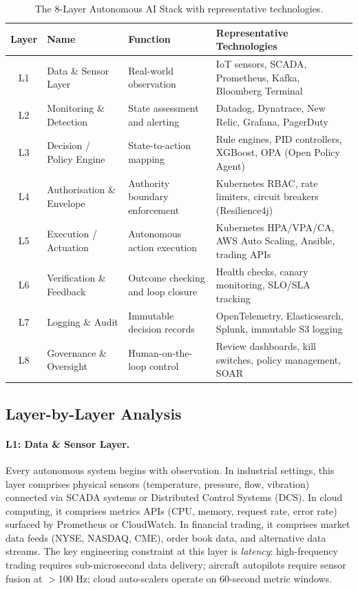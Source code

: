 \documentclass[12pt, a4paper]{article}
\begin{document}
\begin{table}[ht]
\centering
\caption{The 8-Layer Autonomous AI Stack with representative technologies.}
\label{tab:stack}
\begin{tabular}{cllp{7cm}}
\toprule
\textbf{Layer} & \textbf{Name} & \textbf{Function} & \textbf{Representative Technologies} \\
\midrule
L1 & Data \& Sensor Layer         & Real-world observation            & IoT sensors, SCADA, Prometheus, Kafka, Bloomberg Terminal \\
L2 & Monitoring \& Detection      & State assessment and alerting     & Datadog, Dynatrace, New Relic, Grafana, PagerDuty \\
L3 & Decision / Policy Engine     & State-to-action mapping           & Rule engines, PID controllers, XGBoost, OPA (Open Policy Agent) \\
L4 & Authorisation \& Envelope    & Authority boundary enforcement    & Kubernetes RBAC, rate limiters, circuit breakers (Resilience4j) \\
L5 & Execution / Actuation        & Autonomous action execution       & Kubernetes HPA/VPA/CA, AWS Auto Scaling, Ansible, trading APIs \\
L6 & Verification \& Feedback     & Outcome checking and loop closure & Health checks, canary monitoring, SLO/SLA tracking \\
L7 & Logging \& Audit             & Immutable decision records        & OpenTelemetry, Elasticsearch, Splunk, immutable S3 logging \\
L8 & Governance \& Oversight      & Human-on-the-loop control         & Review dashboards, kill switches, policy management, SOAR \\
\bottomrule
\end{tabular}
\end{table}

\subsection{Layer-by-Layer Analysis}

\paragraph{L1: Data \& Sensor Layer.}
Every autonomous system begins with observation. In industrial settings, this layer comprises physical sensors (temperature, pressure, flow, vibration) connected via SCADA systems or Distributed Control Systems (DCS). In cloud computing, it comprises metrics APIs (CPU, memory, request rate, error rate) surfaced by Prometheus or CloudWatch. In financial trading, it comprises market data feeds (NYSE, NASDAQ, CME), order book data, and alternative data streams. The key engineering constraint at this layer is \emph{latency}: high-frequency trading requires sub-microsecond data delivery; aircraft autopilots require sensor fusion at $>$100 Hz; cloud auto-scalers operate on 60-second metric windows.
\end{document}
